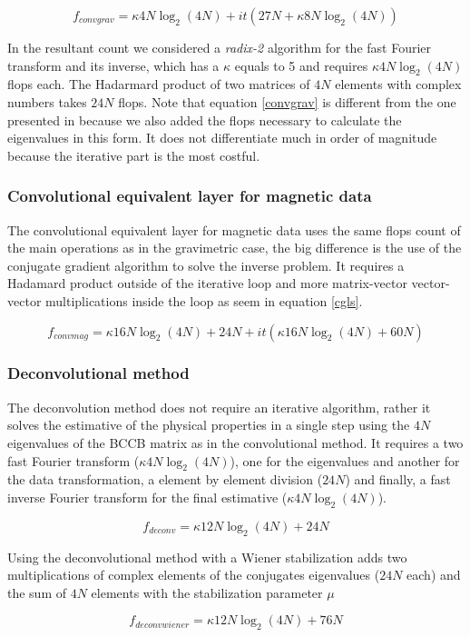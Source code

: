 \begin{equation}
	f_{convgrav} = \kappa4N\log_2(4N) + it(27N + \kappa8N\log_2(4N))
\label{convgrav}
\end{equation}

In the resultant count we considered a \textit{radix-2} algorithm for the fast Fourier transform and its inverse, which has a $\kappa$ equals to 5 and requires $\kappa4N\log_2(4N)$ flops each. The Hadarmard product of two matrices of $4N$ elements with complex numbers takes $24N$ flops. Note that equation \ref{convgrav} is different from the one presented in \cite{takahashi2020} because we also added the flops necessary to calculate the  eigenvalues in this form. It does not differentiate much in order of magnitude because the iterative part is the most costful.

\subsubsection{Convolutional equivalent layer for magnetic data \citep{takahashi2022}}

The convolutional equivalent layer for magnetic data uses the same flops count of the main operations as in the gravimetric case, the big difference is the use of the conjugate gradient algorithm to solve the inverse problem.
It requires a Hadamard product outside of the iterative loop and more matrix-vector vector-vector multiplications inside the loop as seem in equation \ref{cgls}.

\begin{equation}
	f_{convmag} = \kappa16N\log_2(4N) + 24N + it(\kappa16N\log_2(4N) + 60N)
\label{convmag}
\end{equation}

\subsubsection{Deconvolutional method}

The deconvolution method does not require an iterative algorithm, rather it solves the estimative of the physical properties in a single step using the $4N$ eigenvalues of the BCCB matrix as in the convolutional method. It requires a two fast Fourier transform ($\kappa4N\log_2(4N)$), one for the eigenvalues and another for the data transformation, a element by element division ($24N$) and finally, a fast inverse Fourier transform for the final estimative ($\kappa4N\log_2(4N)$).

\begin{equation}
	f_{deconv} = \kappa12N\log_2(4N) + 24N
	\label{deconv}
\end{equation}

Using the deconvolutional method with a Wiener stabilization adds two multiplications of complex elements of the conjugates eigenvalues ($24N$ each) and the sum of $4N$ elements with the stabilization parameter $\mu$

\begin{equation}
	f_{deconvwiener} = \kappa12N\log_2(4N) + 76N
	\label{deconvwiener}
\end{equation}

